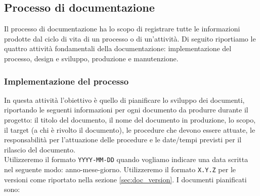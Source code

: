 \subsection{Processo di documentazione} \label{sec:documentation}
    Il processo di documentazione ha lo scopo di registrare tutte le informazioni prodotte dal ciclo di vita di un processo o di un'attività. Di seguito riportiamo le quattro attività fondamentali della documentazione: implementazione del processo, design e sviluppo, produzione e manutenzione.

    \subsubsection{Implementazione del processo}
        In questa attività l'obiettivo è quello di pianificare lo sviluppo dei documenti, riportando le seguenti informazioni per ogni documento da produrre durante il progetto: il titolo del documento, il nome del documento in produzione, lo scopo, il target (a chi è rivolto il documento), le procedure che devono essere attuate, le responsabilità per l'attuazione delle procedure e le date/tempi previsti per il rilascio del documento.
        \\
        Utilizzeremo il formato \verb|YYYY-MM-DD| quando vogliamo indicare una data scritta nel seguente modo: anno-mese-giorno. Utilizzeremo il formato \verb|X.Y.Z| per le versioni come riportato nella sezione \ref{sec:doc_version}. I documenti pianificati sono:
        \\
